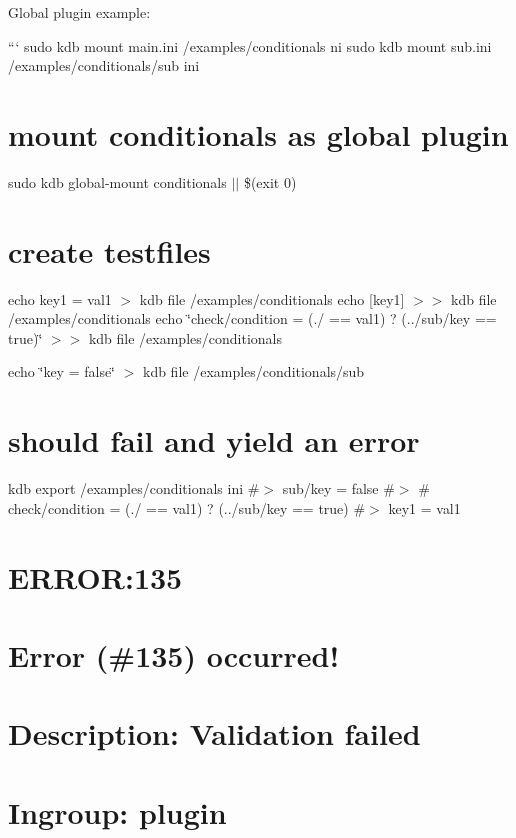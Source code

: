 Global plugin example\+:

``` sudo kdb mount main.\+ini /examples/conditionals ni sudo kdb mount sub.\+ini /examples/conditionals/sub ini

\section*{mount conditionals as global plugin}

sudo kdb global-\/mount conditionals $\vert$$\vert$ \$(exit 0)

\section*{create testfiles}

echo \textquotesingle{}key1 = val1\textquotesingle{} $>$ {\ttfamily kdb file /examples/conditionals} echo \textquotesingle{}\mbox{[}key1\mbox{]}\textquotesingle{} $>$$>$ {\ttfamily kdb file /examples/conditionals} echo \char`\"{}check/condition = (./ == \textquotesingle{}val1\textquotesingle{}) ? (../sub/key == \textquotesingle{}true\textquotesingle{})\char`\"{} $>$$>$ {\ttfamily kdb file /examples/conditionals}

echo \char`\"{}key = false\char`\"{} $>$ {\ttfamily kdb file /examples/conditionals/sub}

\section*{should fail and yield an error}

kdb export /examples/conditionals ini \#$>$ sub/key = false \#$>$ \# check/condition = (./ == \textquotesingle{}val1\textquotesingle{}) ? (../sub/key == \textquotesingle{}true\textquotesingle{}) \#$>$ key1 = val1 \section*{E\+R\+R\+OR\+:135}

\section*{Error (\#135) occurred!}

\section*{Description\+: Validation failed}

\section*{Ingroup\+: plugin}

